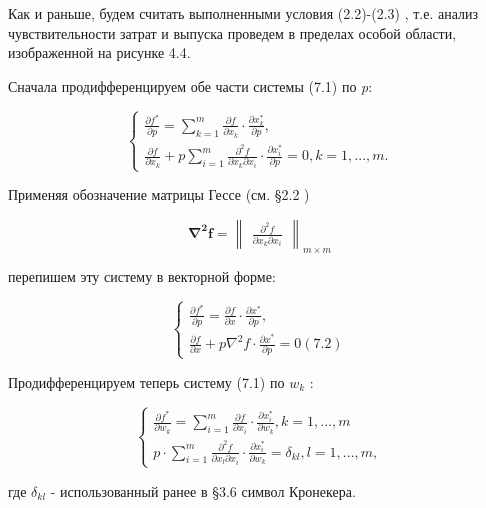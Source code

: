\documentclass[12pt, 4paper]{book}
\begin{document}
{Как и раньше, будем считать выполненными условия (2.2)-(2.3) , т.е. анализ чувствительности затрат и выпуска проведем в пределах особой области, изображенной на рисунке 4.4. 
\par

Сначала продифференцируем обе части системы (7.1) по \textit{p}: 
\begin{center}
$$\left\{
\begin{aligned}
\frac{\partial f^{*}}{\partial p}  = \sum\limits_{k=1}^{m}\frac{\partial f}{\partial x_k}\cdot \frac{\partial x_{k}^{*}}{\partial p},\\
\frac{\partial f}{\partial x_{k}} +p\sum\limits_{i=1}^{m} \frac{\partial^2 f }{\partial x_k \partial x_i} \cdot \frac{\partial x_{i}^{*}}{\partial p}= 0, k=1,...,m.
\end{aligned}
\right.$$
\end{center}
\par

Применяя обозначение матрицы Гессе (см. §2.2 ) 
\begin{center}
\begin{displaymath}
\mathbf{\nabla^2 f} =
\left\| \begin{array}{cccc}
\frac{\partial^2 f}{\partial x_k \partial x_i}
\end{array} \right\|_{m \times m}
\end{displaymath}
\end{center}
перепишем эту систему в векторной форме: 
\begin{center}
$$\left\{
\begin{aligned}
\frac{\partial f^{*}}{\partial p}  = \frac{\partial f}{\partial x} \cdot \frac{\partial x^{*}}{\partial p},\\
\frac{\partial f}{\partial x} +p \nabla^2 f \cdot \frac{\partial x^{*}}{\partial p}=0 (7.2)
\end{aligned}
\right.$$
\end{center}
\par

Продифференцируем теперь систему (7.1) по $w_k$ : 
\begin{center}
$$\left\{
\begin{aligned}
\frac{\partial f^{*}}{\partial w_k}=\sum\limits_{i=1}^{m}\frac{\partial f}{\partial x_i}\cdot \frac{\partial x_{i}^{*}}{\partial w_k}, k=1,...,m \\
p \cdot \sum\limits_{i=1}^{m} \frac{\partial^2 f}{\partial x_l \partial x_i}\cdot \frac{\partial x_{i}^{*}}{\partial w_k}=\delta_{kl},l=1,...,m, 
\end{aligned}
\right.$$
\end{center}
где $\delta_{kl}$ - использованный ранее в §3.6 символ Кронекера. 
\par

}
\end{document}
